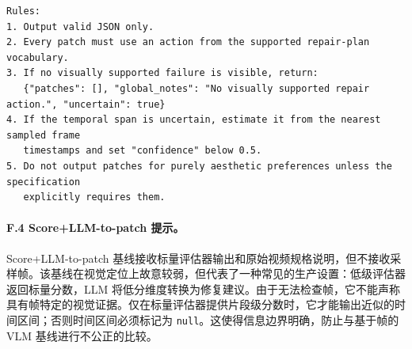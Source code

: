 \documentclass{article}
\begin{document}
\begin{verbatim}
Rules:
1. Output valid JSON only.
2. Every patch must use an action from the supported repair-plan vocabulary.
3. If no visually supported failure is visible, return:
   {"patches": [], "global_notes": "No visually supported repair action.", "uncertain": true}
4. If the temporal span is uncertain, estimate it from the nearest sampled frame
   timestamps and set "confidence" below 0.5.
5. Do not output patches for purely aesthetic preferences unless the specification
   explicitly requires them.
\end{verbatim}

\paragraph{F.4 Score+LLM-to-patch 提示。}
Score+LLM-to-patch 基线接收标量评估器输出和原始视频规格说明，但不接收采样帧。该基线在视觉定位上故意较弱，但代表了一种常见的生产设置：低级评估器返回标量分数，LLM 将低分维度转换为修复建议。由于无法检查帧，它不能声称具有帧特定的视觉证据。仅在标量评估器提供片段级分数时，它才能输出近似的时间区间；否则时间区间必须标记为 \texttt{null}。这使得信息边界明确，防止与基于帧的 VLM 基线进行不公正的比较。
\end{document}
